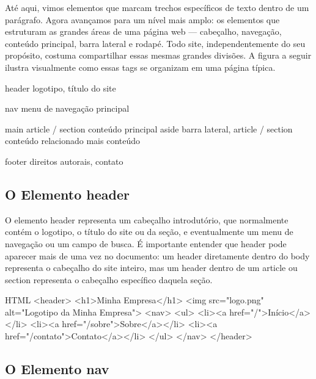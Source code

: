 Até aqui, vimos elementos que marcam trechos específicos de texto dentro de um parágrafo. Agora avançamos para um nível mais amplo: os elementos que estruturam as grandes áreas de uma página web — cabeçalho, navegação, conteúdo principal, barra lateral e rodapé. Todo site, independentemente do seu propósito, costuma compartilhar essas mesmas grandes divisões. A figura a seguir ilustra visualmente como essas tags se organizam em uma página típica.

\begin{infobox}{header}
logotipo, título do site
\end{infobox}

\begin{infobox}{nav}
menu de navegação principal
\end{infobox}

\begin{infobox}{main}
article / section conteúdo principal aside barra lateral, article / section conteúdo relacionado mais conteúdo
\end{infobox}

\begin{infobox}{footer}
direitos autorais, contato
\end{infobox}

\subsection{O Elemento header}

O elemento header representa um cabeçalho introdutório, que normalmente contém o logotipo, o título do site ou da seção, e eventualmente um menu de navegação ou um campo de busca. É importante entender que header pode aparecer mais de uma vez no documento: um header diretamente dentro do body representa o cabeçalho do site inteiro, mas um header dentro de um article ou section representa o cabeçalho específico daquela seção.

\begin{codebox}{HTML}
<header>
  <h1>Minha Empresa</h1>
  <img src="logo.png" alt="Logotipo da Minha Empresa">
  <nav>
    <ul>
      <li><a href="/">Início</a></li>
      <li><a href="/sobre">Sobre</a></li>
      <li><a href="/contato">Contato</a></li>
    </ul>
  </nav>
</header>
\end{codebox}

\subsection{O Elemento nav}

